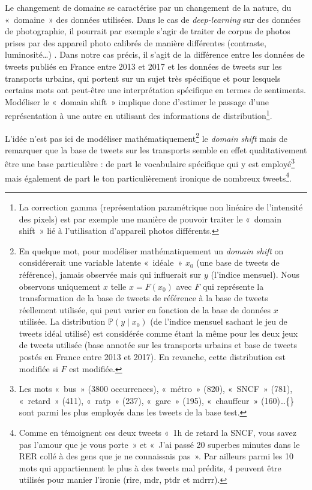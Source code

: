 \documentclass[11pt,french,french]{article}
\let\rmarkdownfootnote\footnote%
\def\footnote{\protect\rmarkdownfootnote}
\begin{document}
Le changement de domaine se caractérise par un changement de la nature, du «~domaine~» des données utilisées.
Dans le cas de \emph{deep-learning} sur des données de photographie, il pourrait par exemple s'agir de traiter de corpus de photos prises par des appareil photo calibrés de manière différentes (contraste, luminosité\dots) .
Dans notre cas précis, il s'agit de la différence entre les données de tweets publiés en France entre 2013 et 2017 et les données de tweets sur les transports urbains, qui portent sur un sujet très spécifique et pour lesquels certains mots ont peut-être une interprétation spécifique en termes de sentiments.
Modéliser le «~domain shift~» implique donc d'estimer le passage d'une représentation à une autre en utilisant des informations de distribution\footnote{La correction gamma (représentation paramétrique non linéaire de l'intensité des pixels) est par exemple une manière de pouvoir traiter le «~domain shift~» lié à l'utilisation d'appareil photos différents.}.

L'idée n'est pas ici de modéliser mathématiquement\footnote{En quelque mot, pour modéliser mathématiquement un \emph{domain shift} on considérerait une variable latente «~idéale~» \(x_0\) (une base de tweets de référence), jamais observée mais qui influerait sur \(y\) (l'indice mensuel).
  Nous observons uniquement \(x\) telle \(x=F(x_0)\) avec \(F\) qui représente la transformation de la base de tweets de référence à la base de tweets réellement utilisée, qui peut varier en fonction de la base de données \(x\) utilisée.
  La distribution \(\mathbb P(y\mid x_0)\) (de l'indice mensuel sachant le jeu de tweets idéal utilisé) est considérée comme étant la même pour les deux jeux de tweets utilisée (base annotée sur les transports urbains et base de tweets postés en France entre 2013 et 2017).
  En revanche, cette distribution est modifiée si \(F\) est modifiée.} le \emph{domain shift} mais de remarquer que la base de tweets sur les transports semble en effet qualitativement être une base particulière : de part le vocabulaire spécifique qui y est employé\footnote{Les mots «~bus~» (3800 occurrences), «~métro~» (820), «~SNCF~» (781), «~retard~» (411), «~ratp~» (237), «~gare~» (195), «~chauffeur~» (160)\dots\{\} sont parmi les plus employés dans les tweets de la base test.} mais également de part le ton particulièrement ironique de nombreux tweets\footnote{Comme en témoignent ces deux tweets «~1h de retard la SNCF, vous savez pas l'amour que je vous porte~» et «~J'ai passé 20 superbes minutes dans le RER collé à des gens que je ne connaissais pas~».
  Par ailleurs parmi les 10 mots qui appartiennent le plus à des tweets mal prédits, 4 peuvent être utilisés pour manier l'ironie (rire, mdr, ptdr et mdrrr).}.
\end{document}
